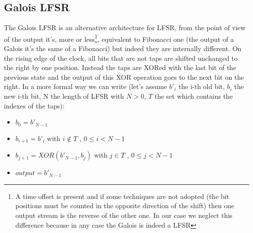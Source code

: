 \documentclass[a4paper]{report}
\begin{document}
\subsection{Galois LFSR}
The Galois LFSR is an alternative architecture for LFSR, from the point of view of the output it's, more or less\footnote{A time offset is present and if some techniques are not adopted (the bit positions must be counted in the opposite direction of the shift) then one output stream is the reverse of the other one. In our case we neglect this difference because in any case the Galois is indeed a LFSR}, equivalent to Fibonacci one (the output of a Galois it's the same of a Fibonacci) but indeed they are internally different. On the rising edge of the clock, all bits that are not taps are shifted unchanged to the right by one position. Instead the taps are XORed with the last bit of the previous state and the output of this XOR operation goes to the next bit on the right. In a more formal way we can write (let's assume $b'_i$ the i-th old bit, $b_i$ the new i-th bit, N the length of LFSR with $N>0$, $T$ the set which contains the indexes of the taps):
\begin{itemize}
	\item $b_0 = b'_{N-1}$
	\item $b_{i+1} = b'_i$ with $i\notin T$ , $0\le i < N-1$
	\item $b_{j+1} = XOR(b'_{N-1} , b_j)$ with $j \in T$ , $0\le j < N-1$
	\item $output = b'_{N-1}$
\end{itemize}
\end{document}

